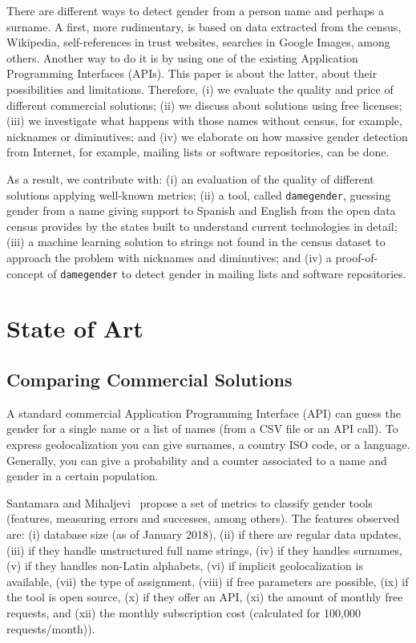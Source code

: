 \documentclass[a4paper]{article}
\begin{document}
There are different ways to detect gender from a person name and perhaps a surname.
A first, more rudimentary, is based on data extracted from the census, Wikipedia, self-references in trust websites, searches in Google Images, among others.
Another way to do it is by using one of the existing Application Programming Interfaces (APIs).
This paper is about the latter, about their possibilities and limitations.
Therefore, (i) we evaluate the quality and price of different commercial solutions;
(ii) we discuss about solutions using free licenses;
(iii) we investigate what happens with those names without census, for example, nicknames or diminutives; and
(iv) we elaborate on how massive gender detection from Internet, for example, mailing
  lists or software repositories, can be done.

As a result, we contribute with: 
(i) an evaluation of the quality of different solutions applying well-known metrics;
(ii) a tool, called \texttt{damegender}, guessing gender from a name giving support to Spanish and
  English from the open data census provides by the states built to understand 
  current technologies in detail;
(iii) a machine learning solution to strings not found in the
  census dataset to approach the problem with nicknames and diminutives; and 
(iv) a proof-of-concept of \texttt{damegender} to detect
  gender in mailing lists and software repositories.



\section{State of Art}

\subsection{Comparing Commercial Solutions}

A standard commercial Application Programming Interface (API) can guess the gender for a single name or a list of names (from a CSV file or an API call). 
To express geolocalization you can give surnames, a country ISO code, or a language. Generally, you can give a probability
and a counter associated to a name and gender in a certain population.

Santamara and Mihaljevi~\cite{10.7717/peerj-cs.156} propose a set of metrics to classify gender tools (features, measuring errors and successes, among others).
The features observed are: (i) database size (as of January 2018), (ii) if there are regular data updates, (iii) if they handle
unstructured full name strings, (iv) if they handles surnames, (v) if they handles non-Latin alphabets, (vi) if implicit geolocalization is available, (vii) the type of assignment, (viii) if free parameters are possible, (ix) if the tool is open source, (x) if they offer an API, (xi) the amount of monthly free requests, and (xii) the monthly subscription cost (calculated for 100,000 requests/month)).
\end{document}
